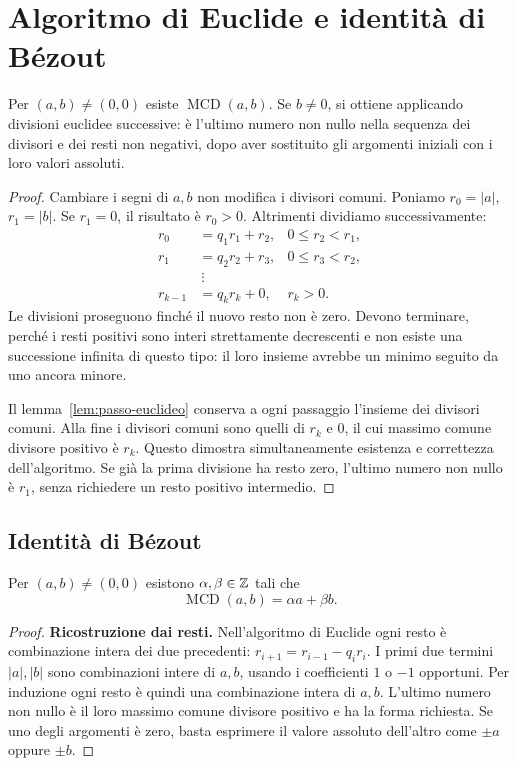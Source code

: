 \section{Algoritmo di Euclide e identità di Bézout}
\begin{teorema}\label{teo:euclide}
Per $(a,b)\ne(0,0)$ esiste $\operatorname{MCD}(a,b)$. Se $b\ne0$, si ottiene applicando divisioni euclidee successive: è l'ultimo numero non nullo nella sequenza dei divisori e dei resti non negativi, dopo aver sostituito gli argomenti iniziali con i loro valori assoluti.
\end{teorema}
\begin{proof}
Cambiare i segni di $a,b$ non modifica i divisori comuni. Poniamo $r_0=|a|$, $r_1=|b|$. Se $r_1=0$, il risultato è $r_0>0$. Altrimenti dividiamo successivamente:
\[
\begin{aligned}
r_0&=q_1r_1+r_2,&0\le r_2<r_1,\\
r_1&=q_2r_2+r_3,&0\le r_3<r_2,\\
&\ \vdots\\
r_{k-1}&=q_kr_k+0,&r_k>0.
\end{aligned}
\]
Le divisioni proseguono finché il nuovo resto non è zero. Devono terminare, perché i resti positivi sono interi strettamente decrescenti e non esiste una successione infinita di questo tipo: il loro insieme avrebbe un minimo seguito da uno ancora minore.

Il lemma~\ref{lem:passo-euclideo} conserva a ogni passaggio l'insieme dei divisori comuni. Alla fine i divisori comuni sono quelli di $r_k$ e $0$, il cui massimo comune divisore positivo è $r_k$. Questo dimostra simultaneamente esistenza e correttezza dell'algoritmo. Se già la prima divisione ha resto zero, l'ultimo numero non nullo è $r_1$, senza richiedere un resto positivo intermedio.
\end{proof}

\subsection{Identità di Bézout}
\begin{teorema}\label{teo:bezout}
Per $(a,b)\ne(0,0)$ esistono $\alpha,\beta\in\mathbb{Z}$ tali che
\[
\operatorname{MCD}(a,b)=\alpha a+\beta b.
\]
\end{teorema}
\begin{proof}
\textbf{Ricostruzione dai resti.} Nell'algoritmo di Euclide ogni resto è combinazione intera dei due precedenti: $r_{i+1}=r_{i-1}-q_ir_i$. I primi due termini $|a|,|b|$ sono combinazioni intere di $a,b$, usando i coefficienti $1$ o $-1$ opportuni. Per induzione ogni resto è quindi una combinazione intera di $a,b$. L'ultimo numero non nullo è il loro massimo comune divisore positivo e ha la forma richiesta. Se uno degli argomenti è zero, basta esprimere il valore assoluto dell'altro come $\pm a$ oppure $\pm b$.
\end{proof}

